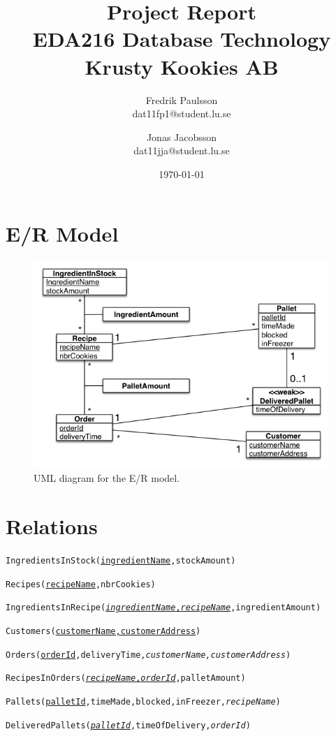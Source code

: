 \documentclass[a4paper]{article}
\title{Project Report \\ EDA216 Database Technology \\ Krusty Kookies AB}
\date{\today}
\author{Fredrik Paulsson \\ dat11fp1@student.lu.se \and Jonas Jacobsson \\ dat11jja@student.lu.se}
\begin{document}
\maketitle

\section{E/R Model}
\begin{figure}[!h]
\centering
\includegraphics[scale=0.7]{projectUMLFinal.png}
\caption{UML diagram for the E/R model.}
\label{uml}
\end{figure}

\section{Relations}
\begin{description}
\item{\texttt{IngredientsInStock(\underline{ingredientName},stockAmount)}}
\item{\texttt{Recipes(\underline{recipeName},nbrCookies)}}
\item{\texttt{IngredientsInRecipe(\underline{\textit{ingredientName},\textit{recipeName}},ingredientAmount)}}
\item{\texttt{Customers(\underline{customerName,customerAddress})}}
\item{\texttt{Orders(\underline{orderId},deliveryTime,\textit{customerName,customerAddress})}}
\item{\texttt{RecipesInOrders(\underline{\textit{recipeName},\textit{orderId}},palletAmount)}}
\item{\texttt{Pallets(\underline{palletId},timeMade,blocked,inFreezer,\textit{recipeName})}}
\item{\texttt{DeliveredPallets(\underline{\textit{palletId}},timeOfDelivery,\textit{orderId})}}
\end{description}
\end{document}
